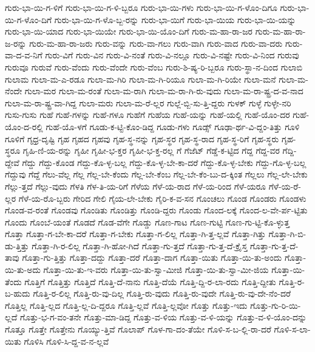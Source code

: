 {ಗುರು-ಭಾ-ಯಿ-ಗ-ಳಿಗೆ
ಗುರು-ಭಾ-ಯಿ-ಗ-ಳಿ-ಬ್ಬರೂ
ಗುರು-ಭಾ-ಯಿ-ಗಳು
ಗುರು-ಭಾ-ಯಿ-ಗ-ಳೊಂ-ದಿಗೂ
ಗುರು-ಭಾ-ಯಿ-ಗ-ಳೊಂ-ದಿಗೆ
ಗುರು-ಭಾ-ಯಿ-ಗ-ಳೊ-ಬ್ಬ-ರನ್ನು
ಗುರು-ಭಾ-ಯಿಗೆ
ಗುರು-ಭಾ-ಯಿಯ
ಗುರು-ಭಾ-ಯಿ-ಯನ್ನು
ಗುರು-ಭಾ-ಯಿ-ಯಾದ
ಗುರು-ಭಾ-ಯಿಯೇ
ಗುರು-ಭಾ-ಯಿ-ಯೊಂ-ದಿಗೆ
ಗುರು-ಮ-ಹಾ-ರಾ-ಜರ
ಗುರು-ಮ-ಹಾ-ರಾ-ಜ-ರನ್ನು
ಗುರು-ಮ-ಹಾ-ರಾ-ಜರು
ಗುರು-ವನ್ನು
ಗುರು-ವಾ-ಗಲು
ಗುರು-ವಾಗಿ
ಗುರು-ವಾದ
ಗುರು-ವಾ-ದರು
ಗುರು-ವಾ-ದ-ವ-ನಿಗೆ
ಗುರು-ವಿಗೆ
ಗುರು-ವಿನ
ಗುರು-ವಿ-ನಂತೆ
ಗುರು-ವಿ-ನಲ್ಲೂ
ಗುರು-ವಿ-ನಷ್ಟೇ
ಗುರು-ವಿ-ನಿಂದ
ಗುರುವು
ಗುರುವೂ
ಗುರುವೆ
ಗುರು-ವೆಂದು
ಗುರು-ವೆಂದೇ
ಗುರು-ವೆಂಬ
ಗುರು-ಶಿ-ಷ್ಯ-ರಿ-ಬ್ಬರೂ
ಗುರು-ಸ್ಥಾ-ನ-ದಿಂದ
ಗುಲಾಬಿ
ಗುಲಾಮ
ಗುಲಾ-ಮ-ಎ-ರಡೂ
ಗುಲಾ-ಮ-ಗಿರಿ
ಗುಲಾ-ಮ-ಗಿ-ರಿಯೂ
ಗುಲಾ-ಮ-ಗಿ-ರಿಯೇ
ಗುಲಾ-ಮನೆ
ಗುಲಾ-ಮ-ನೆಂದೇ
ಗುಲಾ-ಮರ
ಗುಲಾ-ಮ-ರಂತೆ
ಗುಲಾ-ಮ-ರಾಗಿ
ಗುಲಾ-ಮ-ರಾ-ಗಿ-ರು-ವುದು
ಗುಲಾ-ಮ-ರಾ-ಷ್ಟ್ರ-ದ-ವ-ನಾದ
ಗುಲಾ-ಮ-ರಾ-ಷ್ಟ್ರ-ವಾ-ಗಿದ್ದ
ಗುಲಾ-ಮರು
ಗುಲಾ-ಮ-ರೆ-ಲ್ಲರ
ಗುಲ್ಲೆ-ಬ್ಬಿ-ಸು-ತ್ತಿ-ದ್ದರು
ಗುಳಕ್
ಗುಳ್ಳೆ
ಗುಳ್ಳೇ-ನರಿ
ಗುಸು-ಗುಸು
ಗುಹೆ
ಗುಹೆ-ಗಳನ್ನು
ಗುಹೆ-ಗಳೂ
ಗುಹೆಗೆ
ಗುಹೆಯ
ಗುಹೆ-ಯನ್ನು
ಗುಹೆ-ಯಲ್ಲಿ
ಗುಹೆ-ಯೊಂ-ದರ
ಗುಹೆ-ಯೊಂ-ದ-ರಲ್ಲಿ
ಗುಹೆ-ಯೊ-ಳಗೆ
ಗೂಡು-ಕ-ಟ್ಟಿ-ಕೊಂ-ಡಿದ್ದ
ಗೂಡು-ಗಳು
ಗೂಡ್ಸ್
ಗೂಢಾ-ರ್ಥ-ವಿ-ದ್ದಂ-ತಿತ್ತು
ಗೂಳಿ
ಗೂಳಿಗೆ
ಗೃಧ್ರ-ದೃಷ್ಟಿ
ಗೃಹ
ಗೃಹದ
ಗೃಹವು
ಗೃಹ-ಸ್ಥ-ನನ್ನು
ಗೃಹ-ಸ್ಥರ
ಗೃಹ-ಸ್ಥ-ರಾದ
ಗೃಹ-ಸ್ಥ-ರಿಗೆ
ಗೃಹ-ಸ್ಥರು
ಗೃಹ-ಸ್ಥರೂ
ಗೃಹಿ-ಣಿ-ಯ-ರನ್ನು
ಗೃಹೀ
ಗೃಹೀ-ಭ-ಕ್ತರ
ಗೃಹೀ-ಭ-ಕ್ತ-ರಲ್ಲ
ಗೆ
ಗೆಜೆಟ್
ಗೆಡ್ಡೆ-ಕ-ಟ್ಟಿದ
ಗೆದ್ದ
ಗೆದ್ದ-ವರ
ಗೆದ್ದಿ-ದ್ದೇವೆ
ಗೆದ್ದು
ಗೆದ್ದು-ಕೊಂಡ
ಗೆದ್ದು-ಕೊ-ಳ್ಳ-ಬಲ್ಲ
ಗೆದ್ದು-ಕೊ-ಳ್ಳ-ಬೇ-ಕಾ-ದರೆ
ಗೆದ್ದು-ಕೊ-ಳ್ಳ-ಬೇಕು
ಗೆದ್ದು-ಗೊ-ಳ್ಳ-ಬಲ್ಲ
ಗೆದ್ದುವು
ಗೆದ್ದೆ
ಗೆಲು-ವೆಲ್ಲ
ಗೆಲ್ಲ
ಗೆಲ್ಲ-ಬೇ-ಕೆಂದು
ಗೆಲ್ಲ-ಬೇ-ಕೆಂಬ
ಗೆಲ್ಲ-ಬೇ-ಕೆಂ-ಬು-ದ-ಕ್ಕಿಂತ
ಗೆಲ್ಲಲು
ಗೆಲ್ಲ-ಲೇ-ಬೇಕು
ಗೆಲ್ಲು-ತ್ತದೆ
ಗೆಲ್ಲು-ವುದು
ಗೆಳತಿ
ಗೆಳ-ತಿ-ಯ-ರಿಗೆ
ಗೆಳೆಯ
ಗೆಳೆ-ಯ-ರಾದ
ಗೆಳೆ-ಯ-ರಿಂದ
ಗೆಳೆ-ಯರೂ
ಗೆಳೆ-ಯ-ರೆ-ಲ್ಲರ
ಗೆಳೆ-ಯ-ರೊ-ಬ್ಬರು
ಗೇರಿದ
ಗೇಲಿ
ಗೈಯ-ಲೇ-ಬೇಕು
ಗೈರಿ-ಕ-ವ-ಸನ
ಗೊಂಚಲು
ಗೊಂಡ
ಗೊಂಡರು
ಗೊಂಡಳು
ಗೊಂಡ-ವ-ರಂತೆ
ಗೊಂಡವು
ಗೊಂಡಿತು
ಗೊಂಡಿತ್ತು
ಗೊಂಡಿ-ದ್ದರು
ಗೊಂಡು
ಗೊಂದ-ಲಕ್ಕೆ
ಗೊಂದ-ಲ-ವೇ-ರ್ಪ-ಟ್ಟಿತು
ಗೊಂದು
ಗೊಂಬೆ-ಯಂತೆ
ಗೊಡದೆ
ಗೊಡ-ವೆಗೇ
ಗೊಡ್ಡು
ಗೊಣ-ಗಾಟ
ಗೊಣ-ಗುಟ್ಟಿ
ಗೊಣ-ಗು-ಟ್ಟಿ-ಕೊ-ಳ್ಳುತ್ತ
ಗೊತ್ತಾ
ಗೊತ್ತಾ-ಗ-ಬೇ-ಕಾ-ದರೆ
ಗೊತ್ತಾ-ಗ-ಬೇಕು
ಗೊತ್ತಾ-ಗ-ಲಿಲ್ಲ
ಗೊತ್ತಾ-ಗಿ-ತ್ತ-ಲ್ಲವೆ
ಗೊತ್ತಾ-ಗಿತ್ತು
ಗೊತ್ತಾ-ಗಿ-ಬಿ-ಡು-ತ್ತಿತ್ತು
ಗೊತ್ತಾ-ಗಿ-ರ-ಲಿಲ್ಲ
ಗೊತ್ತಾ-ಗಿ-ಹೋ-ಗಿದೆ
ಗೊತ್ತಾ-ಗು-ತ್ತದೆ
ಗೊತ್ತಾ-ಗು-ತ್ತ-ದೆ-ಕ್ರೈಸ್ತ
ಗೊತ್ತಾ-ಗು-ತ್ತ-ದೆ-ತಾವು
ಗೊತ್ತಾ-ಗು-ತ್ತಿತ್ತು
ಗೊತ್ತಾ-ದದ್ದು
ಗೊತ್ತಾ-ದರೆ
ಗೊತ್ತಾ-ದಾಗ
ಗೊತ್ತಾ-ಯಿತು
ಗೊತ್ತಾ-ಯಿ-ತು-ಅಂದು
ಗೊತ್ತಾ-ಯಿ-ತು-ಅದು
ಗೊತ್ತಾ-ಯಿ-ತು-ಇ-ವರು
ಗೊತ್ತಾ-ಯಿ-ತು-ಸ್ವಾ-ಮೀಜಿ
ಗೊತ್ತಾ-ಯಿ-ತು-ಸ್ವಾ-ಮೀ-ಜಿಯ
ಗೊತ್ತಾ-ಯಿ-ತೆಂದು
ಗೊತ್ತಿಗೆ
ಗೊತ್ತಿತ್ತು
ಗೊತ್ತಿದೆ
ಗೊತ್ತಿ-ದೆ-ನಾನು
ಗೊತ್ತಿ-ದೆಯೆ
ಗೊತ್ತಿ-ದ್ದಿ-ರ-ಲಾ-ರದು
ಗೊತ್ತಿ-ದ್ದೀತು
ಗೊತ್ತಿ-ರ-ಬ-ಹುದು
ಗೊತ್ತಿ-ರ-ಲಿಲ್ಲ
ಗೊತ್ತಿ-ರು-ವು-ದಿಲ್ಲ
ಗೊತ್ತಿ-ರು-ವುದು
ಗೊತ್ತಿ-ರು-ವುದೇ
ಗೊತ್ತಿ-ರು-ವು-ದೇ-ನೆಂ-ದರೆ
ಗೊತ್ತಿಲ್ಲ
ಗೊತ್ತಿ-ಲ್ಲದ
ಗೊತ್ತಿ-ಲ್ಲ-ದಿ-ದ್ದರೂ
ಗೊತ್ತಿ-ಲ್ಲವೆ
ಗೊತ್ತಿ-ಲ್ಲವೋ
ಗೊತ್ತು
ಗೊತ್ತು-ಇದು
ಗೊತ್ತು-ಗು-ರಿ-ಯಿ-ಲ್ಲದೆ
ಗೊತ್ತು-ಭ-ಗ-ವಂ-ತನೇ
ಗೊತ್ತು-ಮಾ-ಡಿದ್ದ
ಗೊತ್ತು-ವ-ಳಿಯ
ಗೊತ್ತು-ವ-ಳಿ-ಯನ್ನು
ಗೊತ್ತು-ವ-ಳಿ-ಯೊಂ-ದನ್ನು
ಗೊತ್ತೂ
ಗೊತ್ತೇ
ಗೊತ್ತೇನು
ಗೊಯ್ಯು-ತ್ತಿವೆ
ಗೊಲಾಪ್
ಗೊಳ-ಗಾ-ದಂ-ತೆಯೇ
ಗೊಳಿ-ಸ-ಬ-ಲ್ಲಿ-ರಾ-ದರೆ
ಗೊಳಿ-ಸ-ಲಾ-ಯಿತು
ಗೊಳಿಸಿ
ಗೊಳಿ-ಸಿ-ದ್ದ-ವ-ನ-ಲ್ಲವೆ
}
